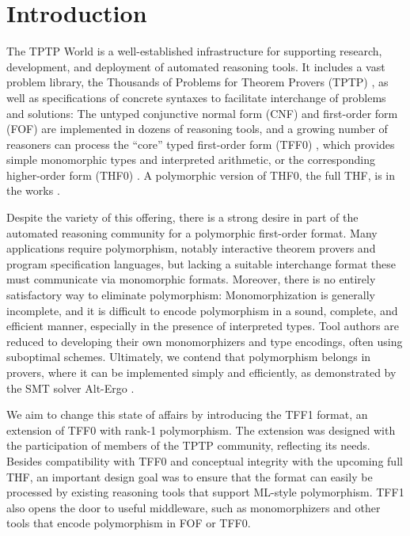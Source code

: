 \section{Introduction}
\label{sec_intro}

The TPTP World \cite{sutcliffe-2010-world} is a well-established infrastructure
for supporting research, development, and deployment of automated reasoning
tools. It includes a vast problem library, the Thousands of Problems for Theorem
Provers (TPTP) \cite{sutcliffe-2009-lib}, as well as specifications of concrete
syntaxes to facilitate interchange of problems and solutions: The untyped
conjunctive normal form (CNF) and first-order form (FOF) are implemented in
dozens of reasoning tools, and a growing number of reasoners can process the
``core'' typed first-order form (TFF0) \cite{sutcliffe-et-al-2012-tff0},
which provides simple monomorphic types and interpreted arithmetic,
or the corresponding higher-order form (THF0) \cite{benzmueller-et-al-2008-thf0}.
A polymorphic version of THF0, the full THF, is in the works
\cite{sutcliffe-benzmueller-2010}.

Despite the variety of this offering, there is a strong desire in part of the automated
reasoning community for a polymorphic first-order format. Many applications
require polymorphism, notably interactive theorem provers and program
specification languages, but lacking a suitable interchange format these
must communicate via monomorphic formats. Moreover, there is no entirely
satisfactory way to eliminate polymorphism: Monomorphization is generally
incomplete, and it is difficult to encode polymorphism in a sound, complete, and
efficient manner, especially in the presence of interpreted types. Tool authors
are reduced to developing their own monomorphizers and type encodings, often
using suboptimal schemes. Ultimately, we contend that polymorphism belongs in
provers, where it can be implemented simply and efficiently, as demonstrated by
the SMT solver Alt-Ergo \cite{bobot-et-al-2008}.

We aim to change this state of affairs by introducing the TFF1
format, an extension of TFF0 with rank-1 polymorphism. The
extension was designed with the participation of members of the TPTP community,
reflecting its needs.
Besides compatibility with TFF0 and conceptual integrity with the upcoming full
THF, an important design goal was to ensure that the format can easily be
processed by existing reasoning tools that support ML-style polymorphism. TFF1
also opens the door to useful middleware, such as monomorphizers and other
tools that encode polymorphism in FOF or TFF0.

